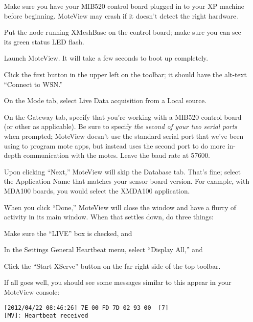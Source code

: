 \documentclass{article}
\begin{document}
\begin{enumerate*}
\item Make sure you have your MIB520 control board plugged in to your XP machine before beginning. MoteView may crash if it doesn't detect the right hardware.
\item Put the node running XMeshBase on the control board; make sure you can see its green status LED flash.
\item Launch MoteView. It will take a few seconds to boot up completely.
\item Click the first button in the upper left on the toolbar; it should have the alt-text ``Connect to WSN.''
\item On the Mode tab, select Live Data acquisition from a Local source.
\item On the Gateway tab, specify that you're working with a MIB520 control board (or other as applicable). Be sure to specify \textit{the second of your two serial ports} when prompted; MoteView doesn't use the standard serial port that we've been using to program mote apps, but instead uses the second port to do more in-depth communication with the motes. Leave the baud rate at 57600.
\item Upon clicking ``Next,'' MoteView will skip the Database tab. That's fine; select the Application Name that matches your sensor board version. For example, with MDA100 boards, you would select the XMDA100 application.
\item When you click ``Done,'' MoteView will close the window and have a flurry of activity in its main window. When that settles down, do three things:
\begin{enumerate*}
\item Make sure the ``LIVE'' box is checked, and
\item In the Settings \textrightarrow General \textrightarrow Heartbeat menu, select ``Display All,'' and
\item Click the ``Start XServe'' button on the far right side of the top toolbar.
\end{enumerate*}
\end{enumerate*}

If all goes well, you should see some messages similar to this appear in your MoteView console:

\begin{verbatim}
[2012/04/22 08:46:26] 7E 00 FD 7D 02 93 00  [7]
[MV]: Heartbeat received
\end{verbatim}
\end{document}
